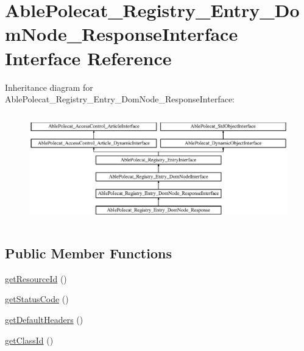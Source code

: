 \hypertarget{interface_able_polecat___registry___entry___dom_node___response_interface}{}\section{Able\+Polecat\+\_\+\+Registry\+\_\+\+Entry\+\_\+\+Dom\+Node\+\_\+\+Response\+Interface Interface Reference}
\label{interface_able_polecat___registry___entry___dom_node___response_interface}
Inheritance diagram for Able\+Polecat\+\_\+\+Registry\+\_\+\+Entry\+\_\+\+Dom\+Node\+\_\+\+Response\+Interface\+:\begin{figure}[H]
\begin{center}
\leavevmode
\includegraphics[height=4.772727cm]{interface_able_polecat___registry___entry___dom_node___response_interface}
\end{center}
\end{figure}
\subsection*{Public Member Functions}
\begin{DoxyCompactItemize}
\item 
\hyperlink{interface_able_polecat___registry___entry___dom_node___response_interface_a0ac412173b2b1d569ef90a1ac095ca5d}{get\+Resource\+Id} ()
\item 
\hyperlink{interface_able_polecat___registry___entry___dom_node___response_interface_a094778dd1c04fe44626000b47ea0c0bb}{get\+Status\+Code} ()
\item 
\hyperlink{interface_able_polecat___registry___entry___dom_node___response_interface_af81180728885fac65715855f27abd1ee}{get\+Default\+Headers} ()
\item 
\hyperlink{interface_able_polecat___registry___entry___dom_node___response_interface_acc9039051a8b6d4fe7c5ddfbaedbcbcb}{get\+Class\+Id} ()
\end{DoxyCompactItemize}
